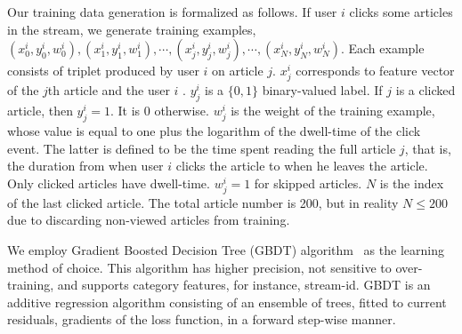 Our training data generation is formalized as follows. If user $i$ clicks some 
articles in the stream, we generate training examples, 
${(x_{0}^{i},y_{0}^{i},w_{0}^{i}),(x_{1}^{i},y_{1}^{i},w_{1}^{i}),\cdots,(x_{j}^{i},y_{j}^{i},w_{j}^{i}),\cdots,(x_{N}^{i},y_{N}^{i},w_{N}^{i})}$.
 Each example consists of triplet produced by user $i$ on article $j$. 
$x_{j}^{i}$ corresponds to feature vector of the $j$th article and the user 
$i$ . $y_{j}^{i}$ is a $\{0,1\}$ binary-valued label. If $j$ is a clicked 
article, 
then $y_{j}^{i}=1$. It is 0 otherwise.  $w_{j}^{i}$ is the weight of the 
training example, whose value is equal to one plus the logarithm of the 
dwell-time of the click event. The latter is defined to be the time spent 
reading the full article $j$, that is, the duration from when user $i$ clicks 
the article to when he leaves the article.  Only clicked articles have 
dwell-time. $w_{j}^{i}=1$ for skipped articles.  $N$ is the index of the last 
clicked article. The total article number is 200, but in reality $N \le 200$ 
due to discarding non-viewed articles from training. 


We employ Gradient Boosted Decision Tree (GBDT) 
algorithm~\cite{Friedman:2002,Ye:2009} as the learning method of choice. This 
algorithm has higher precision, not sensitive to over-training, and supports 
category features, for instance, stream-id. GBDT is an
additive regression algorithm consisting of an ensemble of trees,
fitted to current residuals, gradients of the loss function, in a
forward step-wise manner.



